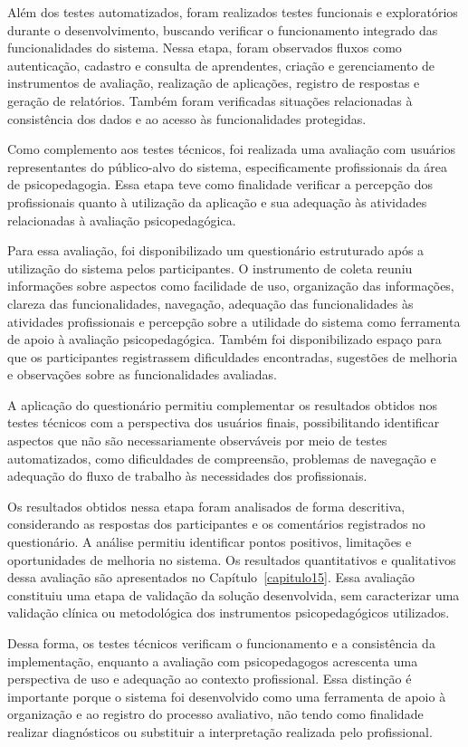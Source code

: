 Além dos testes automatizados, foram realizados testes funcionais e exploratórios durante o desenvolvimento, buscando verificar o funcionamento integrado das funcionalidades do sistema. Nessa etapa, foram observados fluxos como autenticação, cadastro e consulta de aprendentes, criação e gerenciamento de instrumentos de avaliação, realização de aplicações, registro de respostas e geração de relatórios. Também foram verificadas situações relacionadas à consistência dos dados e ao acesso às funcionalidades protegidas.

Como complemento aos testes técnicos, foi realizada uma avaliação com usuários representantes do público-alvo do sistema, especificamente profissionais da área de psicopedagogia. Essa etapa teve como finalidade verificar a percepção dos profissionais quanto à utilização da aplicação e sua adequação às atividades relacionadas à avaliação psicopedagógica.

Para essa avaliação, foi disponibilizado um questionário estruturado após a utilização do sistema pelos participantes. O instrumento de coleta reuniu informações sobre aspectos como facilidade de uso, organização das informações, clareza das funcionalidades, navegação, adequação das funcionalidades às atividades profissionais e percepção sobre a utilidade do sistema como ferramenta de apoio à avaliação psicopedagógica. Também foi disponibilizado espaço para que os participantes registrassem dificuldades encontradas, sugestões de melhoria e observações sobre as funcionalidades avaliadas.

A aplicação do questionário permitiu complementar os resultados obtidos nos testes técnicos com a perspectiva dos usuários finais, possibilitando identificar aspectos que não são necessariamente observáveis por meio de testes automatizados, como dificuldades de compreensão, problemas de navegação e adequação do fluxo de trabalho às necessidades dos profissionais.

Os resultados obtidos nessa etapa foram analisados de forma descritiva, considerando as respostas dos participantes e os comentários registrados no questionário. A análise permitiu identificar pontos positivos, limitações e oportunidades de melhoria no sistema. Os resultados quantitativos e qualitativos dessa avaliação são apresentados no Capítulo~\ref{capitulo15}. Essa avaliação constituiu uma etapa de validação da solução desenvolvida, sem caracterizar uma validação clínica ou metodológica dos instrumentos psicopedagógicos utilizados.

Dessa forma, os testes técnicos verificam o funcionamento e a consistência da implementação, enquanto a avaliação com psicopedagogos acrescenta uma perspectiva de uso e adequação ao contexto profissional. Essa distinção é importante porque o sistema foi desenvolvido como uma ferramenta de apoio à organização e ao registro do processo avaliativo, não tendo como finalidade realizar diagnósticos ou substituir a interpretação realizada pelo profissional.
